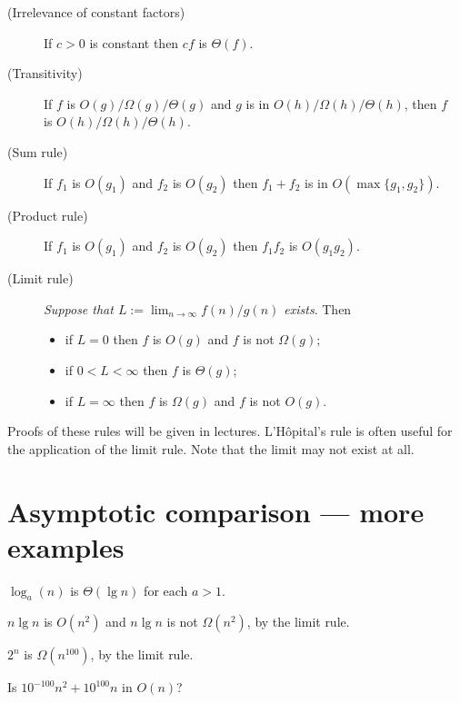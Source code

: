 \begin{description}
\item[(Irrelevance of constant factors)] If $c > 0$ is constant then $cf$ is $\Theta(f)$.
\item[(Transitivity)] If $f$ is $O(g)/\Omega(g)/\Theta(g)$ and $g$ is 
in $O(h)/\Omega(h)/\Theta(h)$, then $f$\\ is $O(h)/\Omega(h)/\Theta(h)$.
\item[(Sum rule)] If $f_1$ is $O(g_1)$ and $f_2$ is $O(g_2)$ then $f_1 + f_2$ is 
in $O(\max\{g_1, g_2\})$.
\item[(Product rule)] If $f_1$ is $O(g_1)$ and $f_2$ is $O(g_2)$ then $f_1 f_2$ 
is $O(g_1 g_2)$.
\item[(Limit rule)] \emph{Suppose that $L:=\lim_{n\to\infty} f(n)/g(n)$ exists}. 
Then
\begin{itemize}
\item if $L = 0$ then $f$ is $O(g)$ and $f$ is not $\Omega(g)$;
\item if $0 < L < \infty$ then $f$ is $\Theta(g)$;
\item if $L = \infty$ then $f$ is $\Omega(g)$ and $f$ is not $O(g)$.
\end{itemize}
\end{description}

Proofs of these rules will be given in lectures. L'H\^{o}pital's rule is often useful for the application of the limit rule. Note that the 
limit may not exist at all.

\section{Asymptotic comparison --- more examples}

\begin{Boxample}[4]
\item $\log_a(n)$ is $\Theta(\lg n)$ for each $a > 1$.

\end{Boxample}

\begin{Boxample}
$n \lg n$ is $O(n^2)$ and $n \lg n$ is not $\Omega(n^2)$, by the limit rule.
\end{Boxample}
\begin{Boxample}
$2^n$ is $\Omega(n^{100})$, by the limit rule.
\end{Boxample}

\begin{Boxample}[4]
Is $10^{-100} n^2 + 10^{100} n$ in $O(n)$?

\end{Boxample}

